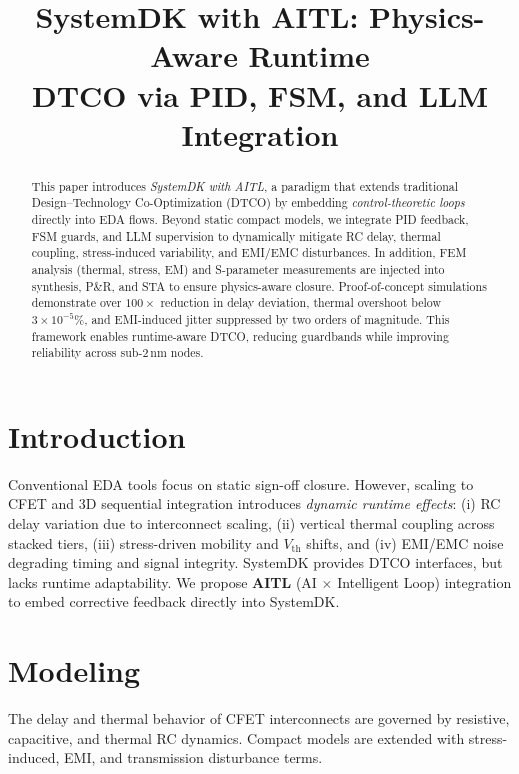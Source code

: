 \documentclass[conference]{IEEEtran}
\begin{document}
\title{SystemDK with AITL: Physics-Aware Runtime\\
DTCO via PID, FSM, and LLM Integration}

\author{
}

\maketitle

\begin{abstract}
This paper introduces \emph{SystemDK with AITL}, a paradigm that extends traditional Design--Technology Co-Optimization (DTCO) by embedding \emph{control-theoretic loops} directly into EDA flows. Beyond static compact models, we integrate PID feedback, FSM guards, and LLM supervision to dynamically mitigate RC delay, thermal coupling, stress-induced variability, and EMI/EMC disturbances. In addition, FEM analysis (thermal, stress, EM) and S-parameter measurements are injected into synthesis, P\&R, and STA to ensure physics-aware closure. Proof-of-concept simulations demonstrate over $100\times$ reduction in delay deviation, thermal overshoot below $3\times10^{-5}\%$, and EMI-induced jitter suppressed by two orders of magnitude. This framework enables runtime-aware DTCO, reducing guardbands while improving reliability across sub-2\,nm nodes.
\end{abstract}

\section{Introduction}
Conventional EDA tools focus on static sign-off closure. However, scaling to CFET and 3D sequential integration introduces \emph{dynamic runtime effects}:
(i) RC delay variation due to interconnect scaling,
(ii) vertical thermal coupling across stacked tiers,
(iii) stress-driven mobility and $V_{\mathrm{th}}$ shifts, and
(iv) EMI/EMC noise degrading timing and signal integrity.
SystemDK provides DTCO interfaces, but lacks runtime adaptability. We propose \textbf{AITL} (AI $\times$ Intelligent Loop) integration to embed corrective feedback directly into SystemDK.

\section{Modeling}
The delay and thermal behavior of CFET interconnects are governed by resistive, capacitive, and thermal RC dynamics. Compact models are extended with stress-induced, EMI, and transmission disturbance terms.
\end{document}
